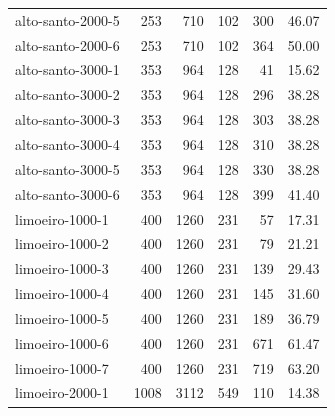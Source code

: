 \begin{table}[h!]
\begin{tabular}{lrrrrr}
		alto-santo-2000-5                                                                    & 253  & 710  & 102 & 300  & 46.07 \\
		alto-santo-2000-6                                                                    & 253  & 710  & 102 & 364  & 50.00 \\ 
		alto-santo-3000-1                                                                    & 353  & 964  & 128 & 41   & 15.62 \\
		alto-santo-3000-2                                                                    & 353  & 964  & 128 & 296  & 38.28 \\
		alto-santo-3000-3                                                                    & 353  & 964  & 128 & 303  & 38.28 \\
		alto-santo-3000-4                                                                    & 353  & 964  & 128 & 310  & 38.28 \\
		alto-santo-3000-5                                                                    & 353  & 964  & 128 & 330  & 38.28 \\
		alto-santo-3000-6                                                                    & 353  & 964  & 128 & 399  & 41.40 \\ \hline
		limoeiro-1000-1                                                                      & 400  & 1260 & 231 & 57   & 17.31 \\
		limoeiro-1000-2                                                                      & 400  & 1260 & 231 & 79   & 21.21 \\
		limoeiro-1000-3                                                                      & 400  & 1260 & 231 & 139  & 29.43 \\
		limoeiro-1000-4                                                                      & 400  & 1260 & 231 & 145  & 31.60 \\
		limoeiro-1000-5                                                                      & 400  & 1260 & 231 & 189  & 36.79 \\
		limoeiro-1000-6                                                                      & 400  & 1260 & 231 & 671  & 61.47 \\
		limoeiro-1000-7                                                                      & 400  & 1260 & 231 & 719  & 63.20 \\ 
		limoeiro-2000-1                                                                      & 1008 & 3112 & 549 & 110  & 14.38 \\

\end{tabular}
\end{table}
